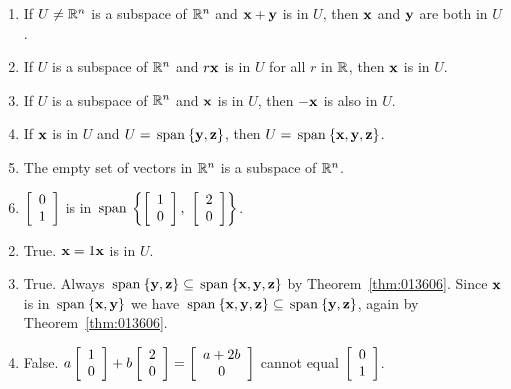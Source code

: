\begin{multicols}{2}
\begin{ex}
\begin{enumerate}[label={\alph*.}]
\item If $U \neq \mathbb{R}^n$ is a subspace of $\mathbb{R}^n$ and $\textbf{x} + \textbf{y}$ is in $U$, then $\textbf{x}$ and $\textbf{y}$ are both in $U$.

\item If $U$ is a subspace of $\mathbb{R}^n$ and $r\textbf{x}$ is in $U$ for all $r$ in $\mathbb{R}$, then $\textbf{x}$ is in $U$.

\item If $U$ is a subspace of $\mathbb{R}^n$ and $\textbf{x}$ is in $U$, then $-\textbf{x}$ is also in $U$.

\item If $\textbf{x}$ is in $U$ and $U = \thinspace\operatorname{span\medspace}\{\textbf{y}, \textbf{z}\}$, then $U = \thinspace\operatorname{span\medspace}\{\textbf{x}, \textbf{y}, \textbf{z}\}$.

\item The empty set of vectors in $\mathbb{R}^n$ is a subspace of $\mathbb{R}^n$.

\item 
$\left[ \begin{array}{r}
0 \\
1
\end{array} \right]$ is in $\thinspace\operatorname{span\medspace}
\left\{
\left[ \begin{array}{r}
1 \\
0
\end{array} \right],\
\left[ \begin{array}{r}
2 \\
0
\end{array} \right]
\right\}$.

\end{enumerate}
\begin{sol}
\begin{enumerate}[label={\alph*.}]
\setcounter{enumi}{1}
\item  True. $\textbf{x} = 1\textbf{x}$ is in $U$.

\setcounter{enumi}{3}
\item  True. Always $\thinspace\operatorname{span\medspace}\{\textbf{y}, \textbf{z}\} \subseteq \thinspace\operatorname{span\medspace}\{\textbf{x}, \textbf{y}, \textbf{z}\}$ by Theorem~\ref{thm:013606}. Since $\textbf{x}$ is in $\thinspace\operatorname{span\medspace}\{\textbf{x}, \textbf{y}\}$ we have $\thinspace\operatorname{span\medspace}\{\textbf{x}, \textbf{y}, \textbf{z}\}  \subseteq \thinspace\operatorname{span\medspace}\{\textbf{y}, \textbf{z}\}$, again by Theorem~\ref{thm:013606}.

\setcounter{enumi}{5}
\item  False. $a 
\left[ \begin{array}{r}
1 \\
0
\end{array} \right]
+ b
\left[ \begin{array}{r}
2 \\
0
\end{array} \right]
= 
\left[ \begin{array}{c}
a + 2b \\
0
\end{array} \right]
$ cannot equal $
\left[ \begin{array}{r}
0 \\
1
\end{array} \right]$.


\end{enumerate}
\end{sol}
\end{ex}
\end{multicols}
